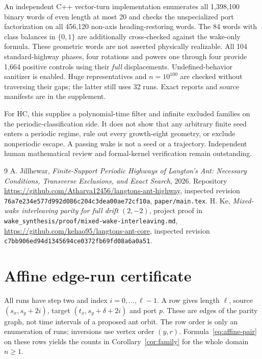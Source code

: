 \documentclass[11pt]{article}
\begin{document}
An independent C++ vector-turn implementation enumerates all 1,398,100 binary
words of even length at most 20 and checks the unspecialized port factorization
on all 456,120 non-axis heading-restoring words. The 84 words with class balances
in $\{0,1\}$ are additionally cross-checked against the wake-only formula. These
geometric words are not asserted physically realizable.
All 104 standard-highway phases, four rotations and powers one through four
provide 1,664 positive controls using their \emph{full} displacements.
Undefined-behavior sanitizer is enabled. Huge representatives and $n=10^{100}$
are checked without traversing their gaps; the latter still uses 32 runs.
Exact reports and source manifests are in the supplement.

For HC, this supplies a polynomial-time filter and infinite excluded families
on the periodic-classification side. It does not show that any arbitrary finite
seed enters a periodic regime, rule out every growth-eight geometry, or exclude
nonperiodic escape. A passing wake is not a seed or a trajectory. Independent
human mathematical review and formal-kernel verification remain outstanding.

\begin{thebibliography}{9}
 A. Jillhewar, \emph{Finite-Support Periodic Highways of Langton's Ant:
Necessary Conditions, Transverse Exclusions, and Exact Search}, 2026.
Repository \url{https://github.com/Atharva12456/langtons-ant-highway},
inspected revision \texttt{76a7e234e577d992d086c204c3dea00ae72cf10a},
\texttt{paper/main.tex}.
 H. Ke, \emph{Mixed-wake interleaving parity for full drift $(2,-2)$},
project proof in \texttt{wake\_synthesis/proof/mixed-wake-interleaving.md},
\url{https://github.com/kehao95/langtons-ant-core}, inspected revision
\texttt{c7bb906ed94d1345694ce0372fb69fd08a6a0a51}.
\end{thebibliography}

\clearpage
\appendix
\section{Affine edge-run certificate}\label{app:runs}
All runs have step two and index $i=0,\ldots,\ell-1$. A row gives length $\ell$,
source $(s_x,s_y+2i)$, target $(t_x,s_y+\delta+2i)$ and port $p$.
These are edges of the parity graph, not time intervals of a proposed ant orbit.
The row order is only an enumeration of runs; inversions use vertex order $(y,r)$.
Formula~\eqref{eq:affine-pair} on these rows yields the counts in
Corollary~\ref{cor:family} for the whole domain $n\ge1$.
\end{document}
